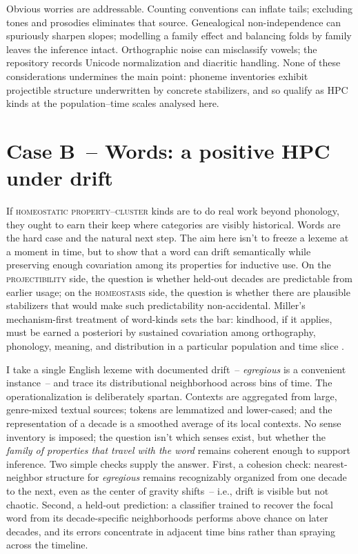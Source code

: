 \documentclass[12pt]{article}
\begin{document}
Obvious worries are addressable. Counting conventions can inflate tails; excluding tones and prosodies eliminates that source. Genealogical non-independence can spuriously sharpen slopes; modelling a family effect and balancing folds by family leaves the inference intact. Orthographic noise can misclassify vowels; the repository records Unicode normalization and diacritic handling. None of these considerations undermines the main point: phoneme inventories exhibit projectible structure underwritten by concrete stabilizers, and so qualify as \textsc{HPC} kinds at the population–time scales analysed here.

\section{Case B~-- Words: a positive HPC under drift}\label{sec:case-word}

If \textsc{homeostatic property–cluster} kinds are to do real work beyond phonology, they ought to earn their keep where categories are visibly historical. Words are the hard case and the natural next step. The aim here isn't to freeze a lexeme at a moment in time, but to show that a word can drift semantically while preserving enough covariation among its properties for inductive use. On the \textsc{projectibility} side, the question is whether held-out decades are predictable from earlier usage; on the \textsc{homeostasis} side, the question is whether there are plausible stabilizers that would make such predictability non-accidental. Miller’s mechanism-first treatment of word-kinds sets the bar: kindhood, if it applies, must be earned a posteriori by sustained covariation among orthography, phonology, meaning, and distribution in a particular population and time slice \citep{Miller2021WordsSpeciesKinds}.

I take a single English lexeme with documented drift~-- \emph{egregious} is a convenient instance~-- and trace its distributional neighborhood across bins of time. The operationalization is deliberately spartan. Contexts are aggregated from large, genre-mixed textual sources; tokens are lemmatized and lower-cased; and the representation of a decade is a smoothed average of its local contexts. No sense inventory is imposed; the question isn't which senses exist, but whether the \emph{family of properties that travel with the word} remains coherent enough to support inference. Two simple checks supply the answer. First, a cohesion check: nearest-neighbor structure for \emph{egregious} remains recognizably organized from one decade to the next, even as the center of gravity shifts~-- i.e., drift is visible but not chaotic. Second, a held-out prediction: a classifier trained to recover the focal word from its decade-specific neighborhoods performs above chance on later decades, and its errors concentrate in adjacent time bins rather than spraying across the timeline.
\end{document}
